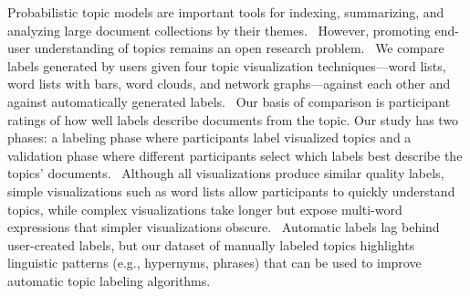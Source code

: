 Probabilistic topic models are important tools for indexing, summarizing, and analyzing large document collections by their themes.  However, promoting end-user understanding of topics remains an open research problem.  We compare labels generated by users given four topic visualization techniques—word lists, word lists with bars, word clouds, and network graphs—against each other and against automatically generated labels.  Our basis of comparison is participant ratings of how well labels describe documents from the topic. Our study has two phases{:} a labeling phase where participants label visualized topics and a validation phase where different participants select which labels best describe the topics' documents.  Although all visualizations produce similar quality labels, simple visualizations such as word lists allow participants to quickly understand topics, while complex visualizations take longer but expose multi-word expressions that simpler visualizations obscure.  Automatic labels lag behind user-created labels, but our dataset of manually labeled topics highlights linguistic patterns (e.g., hypernyms, phrases) that can be used to improve automatic topic labeling algorithms.